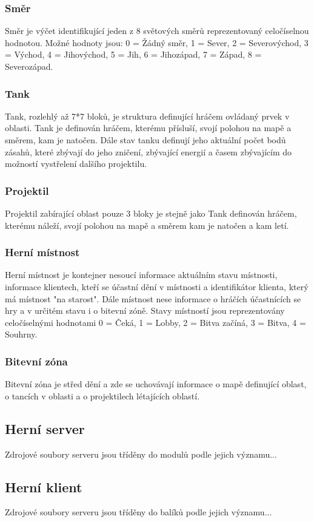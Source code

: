 \documentclass[12pt,a4paper]{article}
\begin{document}
\subsubsection*{Směr}
Směr je výčet identifikující jeden z 8 světových směrů reprezentovaný celočíselnou hodnotou. Možné hodnoty jsou: 0 = Žádný směr, 1 = Sever, 2 = Severovýchod, 3 = Východ, 4 = Jihovýchod, 5 = Jih, 6 = Jihozápad, 7 = Západ, 8 = Severozápad.
\subsubsection*{Tank}
Tank, rozlehlý až 7*7 bloků, je struktura definující hráčem ovládaný prvek v oblasti. Tank je definován hráčem, kterému přísluší, svojí polohou na mapě a směrem, kam je natočen. Dále stav tanku definují jeho aktuální počet bodů zásahů, které zbývají do jeho zničení, zbývající energií a časem zbývajícím do možností vystřelení dalšího projektilu.
\subsubsection*{Projektil}
Projektil zabírající oblast pouze 3 bloky je stejně jako Tank definován hráčem, kterému náleží, svojí polohou na mapě a směrem kam je natočen a kam letí.
\subsubsection{Herní místnost}
Herní místnost je kontejner nesoucí informace aktuálním stavu místnosti, informace klientech, kteří se účastní dění v místnosti a identifikátor klienta, který má místnost "na starost". Dále místnost nese informace o hráčích účastnících se hry a v určitém stavu i o bitevní zóně.
Stavy místností jsou reprezentovány celočíselnými hodnotami 0 = Čeká, 1 = Lobby, 2 = Bitva začíná, 3 = Bitva, 4 = Souhrny.
\subsubsection*{Bitevní zóna}
Bitevní zóna je střed dění a zde se uchovávají informace o mapě definující oblast, o tancích v oblasti a o projektilech létajících oblastí.


\subsection{Herní server}
Zdrojové soubory serveru jsou tříděny do modulů podle jejich významu...
\subsection{Herní klient}
Zdrojové soubory serveru jsou tříděny do balíků podle jejich významu...
\end{document}
